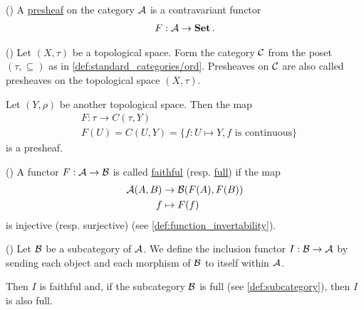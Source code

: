 \begin{definition}\label{def:presheaf}(\cite[definition 1.2.15]{Leinster2014})
  A \uline{presheaf} on the category $\mathcal A$ is a contravariant functor
  \begin{align*}
    F: \mathcal A \to \operatorname{\mathbf{Set}}.
  \end{align*}
\end{definition}

\begin{example}\label{ex:topological_space_presheaf}(\cite[24]{Leinster2014})
  Let $(X, \tau)$ be a topological space. Form the category $\mathcal C$ from the poset $(\tau, \subseteq)$ as in \cref{def:standard_categories/ord}. Presheaves on $\mathcal C$ are also called presheaves on the topological space $(X, \tau)$.

  Let $(Y, \rho)$ be another topological space. Then the map
  \begin{align*}
    &F: \tau \to C(\tau, Y) \\
    &F(U) = C(U, Y) = \{ f: U \mapsto Y, f \text{ is continuous} \}
  \end{align*}
  is a presheaf.
\end{example}

\begin{definition}\label{def:faithful_full_functors}(\cite[definition 1.2.16]{Leinster2014})
  A functor $F: \mathcal A \to \mathcal B$ is called \uline{faithful} (resp. \uline{full}) if the map
  \begin{align*}
    \mathcal A(A, B) &\to \mathcal B(F(A), F(B)) \\
    f &\mapsto F(f)
  \end{align*}
  is injective (resp. surjective) (see \cref{def:function_invertability}).
\end{definition}

\begin{example}\label{def:subcategory_functors}(\cite[25]{Leinster2014})
  Let $\mathcal B$ be a subcategory of $\mathcal A$. We define the inclusion functor $I: \mathcal B \to \mathcal A$ by sending each object and each morphism of $\mathcal B$ to itself within $\mathcal A$.

  Then $I$ is faithful and, if the subcategory $\mathcal B$ is full (see \cref{def:subcategory}), then $I$ is also full.
\end{example}

